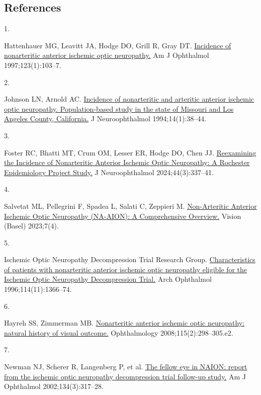 \documentclass[
  11pt,
]{article}
\newlength{\cslhangindent}
\newlength{\csllabelwidth}
\newenvironment{CSLReferences}[2] %
 {\begin{list}{}{%
  \setlength{\itemindent}{0pt}
  \setlength{\leftmargin}{0pt}
  \setlength{\parsep}{0pt}
  \ifodd #1
   \setlength{\leftmargin}{\cslhangindent}
   \setlength{\itemindent}{-1\cslhangindent}
  \fi
  \setlength{\itemsep}{#2\baselineskip}}}
 {\end{list}}
\newcommand{\CSLLeftMargin}[1]{\parbox[t]{\csllabelwidth}{\strut#1\strut}}
\newcommand{\CSLRightInline}[1]{\parbox[t]{\linewidth - \csllabelwidth}{\strut#1\strut}}
\begin{document}
\subsection*{References}\label{references}

\protect{}\label{refs}
\begin{CSLReferences}{0}{1}
\CSLLeftMargin{1. }%
\CSLRightInline{Hattenhauer MG, Leavitt JA, Hodge DO, Grill R, Gray DT.
\href{https://doi.org/10.1016/s0002-9394(14)70999-7}{{Incidence of
nonarteritic anterior ischemic optic neuropathy.}} Am J Ophthalmol
1997;123(1):103--7. }

\CSLLeftMargin{2. }%
\CSLRightInline{Johnson LN, Arnold AC. \href{}{{Incidence of
nonarteritic and arteritic anterior ischemic optic neuropathy.
Population-based study in the state of Missouri and Los Angeles County,
California.}} J Neuroophthalmol 1994;14(1):38--44. }

\CSLLeftMargin{3. }%
\CSLRightInline{Foster RC, Bhatti MT, Crum OM, Lesser ER, Hodge DO, Chen
JJ. \href{https://doi.org/10.1097/WNO.0000000000002102}{{Reexamining the
Incidence of Nonarteritic Anterior Ischemic Optic Neuropathy: A
Rochester Epidemiology Project Study.}} J Neuroophthalmol
2024;44(3):337--41. }

\CSLLeftMargin{4. }%
\CSLRightInline{Salvetat ML, Pellegrini F, Spadea L, Salati C, Zeppieri
M. \href{https://doi.org/10.3390/vision7040072}{{Non-Arteritic Anterior
Ischemic Optic Neuropathy (NA-AION): A Comprehensive Overview.}} Vision
(Basel) 2023;7(4). }

\CSLLeftMargin{5. }%
\CSLRightInline{Ischemic Optic Neuropathy Decompression Trial Research
Group.
\href{https://doi.org/10.1001/archopht.1996.01100140566007}{{Characteristics
of patients with nonarteritic anterior ischemic optic neuropathy
eligible for the Ischemic Optic Neuropathy Decompression Trial.}} Arch
Ophthalmol 1996;114(11):1366--74. }

\CSLLeftMargin{6. }%
\CSLRightInline{Hayreh SS, Zimmerman MB.
\href{https://doi.org/10.1016/j.ophtha.2007.05.027}{{Nonarteritic
anterior ischemic optic neuropathy: natural history of visual outcome.}}
Ophthalmology 2008;115(2):298--305.e2. }

\CSLLeftMargin{7. }%
\CSLRightInline{Newman NJ, Scherer R, Langenberg P, et al.
\href{https://doi.org/10.1016/s0002-9394(02)01639-2}{{The fellow eye in
NAION: report from the ischemic optic neuropathy decompression trial
follow-up study.}} Am J Ophthalmol 2002;134(3):317--28. }


\end{CSLReferences}
\end{document}
